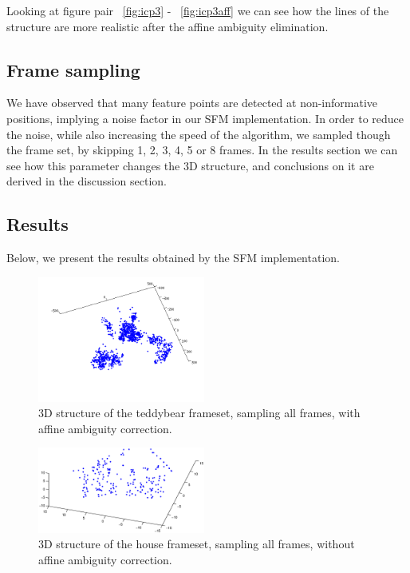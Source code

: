 Looking at figure pair ~\ref{fig:icp3} - ~\ref{fig:icp3aff} we can see how the lines of the structure are more realistic after the affine ambiguity elimination.


\subsection{Frame sampling}
We have observed that many feature points are detected at non-informative positions, implying a noise factor in our SFM implementation. In order to reduce the noise, while also increasing the speed of the algorithm, we sampled though the frame set, by skipping 1, 2, 3, 4, 5 or 8 frames. In the results section we can see how this parameter changes the 3D structure, and conclusions on it are derived in the discussion section.


\subsection{Results}

Below, we present the results obtained by the SFM implementation. 

\begin{figure}[ht!]
  \centering
    \includegraphics[width=0.49\textwidth]{figures/teddy.png}
    \caption{3D structure of the teddybear frameset, sampling all frames, with affine ambiguity correction.}
    \label{fig:teddybearz}
\end{figure}


\begin{figure}[ht!]
  \centering
    \includegraphics[width=0.49\textwidth]{figures/1-46amb.eps}
    \caption{3D structure of the house frameset, sampling all frames, without affine ambiguity correction.}
    \label{fig:icp1-46-Amb}
\end{figure}

